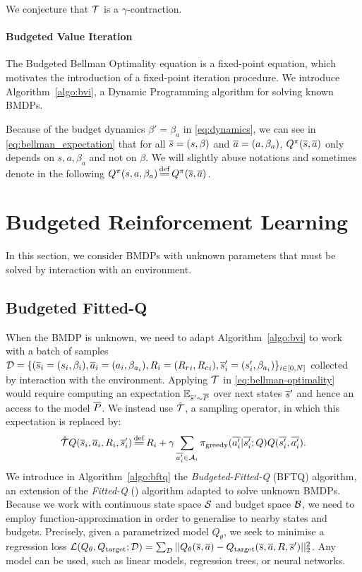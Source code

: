 \documentclass{article}
\begin{document}
\begin{conjecture}[Contractivity of $\cT$]
We conjecture that $\cT$ is a $\gamma$-contraction.
\end{conjecture}

\paragraph{Budgeted Value Iteration}

The Budgeted Bellman Optimality equation is a fixed-point equation, which motivates the introduction of a fixed-point iteration procedure. We introduce Algorithm~\ref{algo:bvi}, a Dynamic Programming algorithm for solving known BMDPs.

Because of the budget dynamics $\beta' = \beta_a$ in \eqref{eq:dynamics}, we can see in \eqref{eq:bellman_expectation} that for all $\overline{s}=(s, \beta)$ and $\overline{a}=(a, \beta_a)$, $Q^\pi(\overline{s}, \overline{a})$ only depends on $s, a, \beta_a$ and not on $\beta$. We will slightly abuse notations and sometimes denote in the following $Q^\pi(s, a, \beta_a) \eqdef Q^\pi(\os, \oa)$.

\section{Budgeted Reinforcement Learning}

In this section, we consider BMDPs with unknown parameters that must be solved by interaction with an environment. 

\subsection{Budgeted Fitted-Q}

When the BMDP is unknown, we need to adapt Algorithm~\ref{algo:bvi} to work with a batch of samples $\mathcal{D}=\{(\overline{s}_i=(s_i,\beta_i),\overline{a}_i=(a_i,\beta_{a_i}),R_i=({R_r}_i,{R_c}_i),\overline{s}_i'=(s_i',\beta_{a_i})\}_{i\in [0,N]}$ collected by interaction with the environment. Applying $\cT$ in \eqref{eq:bellman-optimality} would require computing an expectation $\operatorname*{\mathbb{E}}_{\overline{s}'\sim \overline{P}}$ over next states $\overline{s}'$ and hence an access to the model $\overline{P}$. We instead use $\hat{\mathcal{T}}$, a sampling operator, in which this expectation is replaced by:
\begin{equation*}
    \hat{\cT} Q(\os_i, \oa_i, R_i, \os'_i) \eqdef R_i + \gamma \sum_{\ov{a'_i}\in \cA_i} \pi_\text{greedy}(\ov{a'_i}|\ov{s'_i}; Q) Q(\ov{s'_i}, \ov{a'_i}).
\end{equation*}
We introduce in Algorithm~\ref{algo:bftq} the \emph{Budgeted-Fitted-Q} (BFTQ) algorithm, an extension of the \emph{Fitted-Q} (\FTQ) algorithm \citep{Ernst2005,Riedmiller2005} adapted to solve unknown BMDPs. Because we work with  continuous state space $\mathcal{S}$ and budget space $\mathcal{B}$, we need to employ function-approximation in order to generalise to nearby states and budgets. Precisely, given a parametrized model $Q_\theta$, we seek to minimise a regression loss $\mathcal{L}(Q_\theta, Q_\text{target};\mathcal{D}) = \sum_{\mathcal{D}} ||Q_\theta(\overline{s}, \overline{a}) - Q_\text{target}(\overline{s}, \overline{a}, R, \overline{s}')||_2^2$.
Any model can be used, such as linear models, regression trees, or neural networks.
\end{document}
